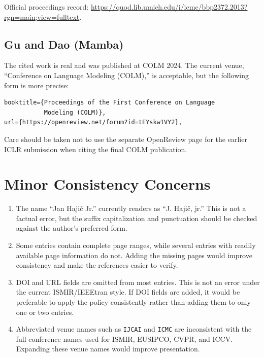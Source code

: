 \documentclass[11pt]{article}
\begin{document}
Official proceedings record: \url{https://quod.lib.umich.edu/i/icmc/bbp2372.2013?rgn=main;view=fulltext}.

\subsection{Gu and Dao (Mamba)}

The cited work is real and was published at COLM 2024. The current venue, ``Conference on Language Modeling (COLM),'' is acceptable, but the following form is more precise:

\begin{verbatim}
booktitle={Proceedings of the First Conference on Language
           Modeling (COLM)},
url={https://openreview.net/forum?id=tEYskw1VY2},
\end{verbatim}

Care should be taken not to use the separate OpenReview page for the earlier ICLR submission when citing the final COLM publication.

\section{Minor Consistency Concerns}

\begin{enumerate}
  \item The name ``Jan Haji\v{c} Jr.'' currently renders as ``J. Haji\v{c}, jr.'' This is not a factual error, but the suffix capitalization and punctuation should be checked against the author's preferred form.

  \item Some entries contain complete page ranges, while several entries with readily available page information do not. Adding the missing pages would improve consistency and make the references easier to verify.

  \item DOI and URL fields are omitted from most entries. This is not an error under the current ISMIR/IEEEtran style. If DOI fields are added, it would be preferable to apply the policy consistently rather than adding them to only one or two entries.

  \item Abbreviated venue names such as \texttt{IJCAI} and \texttt{ICMC} are inconsistent with the full conference names used for ISMIR, EUSIPCO, CVPR, and ICCV. Expanding these venue names would improve presentation.
\end{enumerate}
\end{document}
